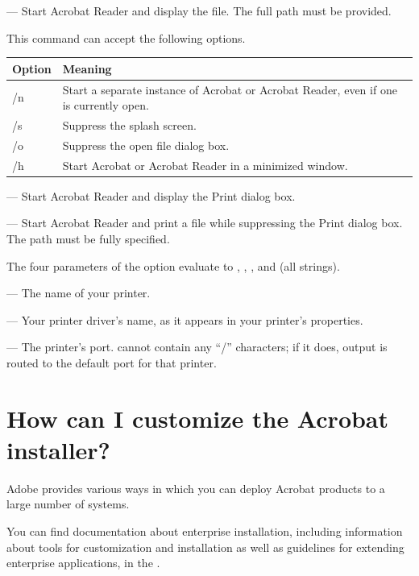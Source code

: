 \documentclass[letterpaper,12pt,english,openany,oneside]{sphinxmanual}
\begin{document}
  — Start Acrobat Reader and display the file. The full path must be provided.

This command can accept the following options.


\begin{savenotes}\sphinxattablestart
\centering
\begin{tabulary}{\linewidth}[t]{|T|T|}
\hline
\sphinxstyletheadfamily 
Option
&\sphinxstyletheadfamily 
Meaning
\\
\hline
/n
&
Start a separate instance of Acrobat or Acrobat Reader, even if one is currently open.
\\
\hline
/s
&
Suppress the splash screen.
\\
\hline
/o
&
Suppress the open file dialog box.
\\
\hline
/h
&
Start Acrobat or Acrobat Reader in a minimized window.
\\
\hline
\end{tabulary}
\par
\sphinxattableend\end{savenotes}

  — Start Acrobat Reader and display the Print dialog box.

  — Start Acrobat Reader and print a file while suppressing the Print dialog box. The path must be fully specified.

The four parameters of the  option evaluate to  ,  ,  , and  (all strings).

 — The name of your printer.

 — Your printer driver’s name, as it appears in your printer’s properties.

 — The printer’s port.  cannot contain any “/” characters; if it does, output is routed to the default port for that printer.


\section{How can I customize the Acrobat installer?}
\label{\detokenize{apxDevFAQ:how-can-i-customize-the-acrobat-installer}}
Adobe provides various ways in which you can deploy Acrobat products to a large number of systems.

You can find documentation about enterprise installation, including information about tools for customization and installation as well as guidelines for extending enterprise applications, in the  .



\renewcommand{\indexname}{Index}
\printindex
\end{document}
